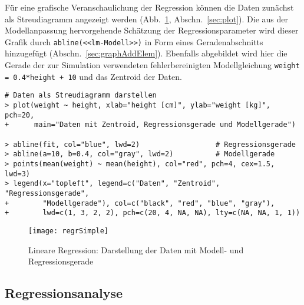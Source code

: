 Für eine grafische Veranschaulichung der Regression können die Daten zunächst als Streudiagramm angezeigt werden (Abb.\ \ref{fig:regrSimple}, Abschn.\ \ref{sec:plot}). Die aus der Modellanpassung hervorgehende Schätzung der Regressionsparameter wird dieser Grafik durch \lstinline!abline(<<lm-Modell>>)! in Form eines Geradenabschnitts hinzugefügt (Abschn.\ \ref{sec:graphAddElem}). Ebenfalls abgebildet wird hier die Gerade der zur Simulation verwendeten fehlerbereinigten Modellgleichung \lstinline!weight = 0.4*height + 10! und das Zentroid der Daten.
\begin{lstlisting}
# Daten als Streudiagramm darstellen
> plot(weight ~ height, xlab="height [cm]", ylab="weight [kg]", pch=20,
+      main="Daten mit Zentroid, Regressionsgerade und Modellgerade")

> abline(fit, col="blue", lwd=2)                  # Regressionsgerade
> abline(a=10, b=0.4, col="gray", lwd=2)          # Modellgerade
> points(mean(weight) ~ mean(height), col="red", pch=4, cex=1.5, lwd=3)
> legend(x="topleft", legend=c("Daten", "Zentroid", "Regressionsgerade",
+        "Modellgerade"), col=c("black", "red", "blue", "gray"),
+        lwd=c(1, 3, 2, 2), pch=c(20, 4, NA, NA), lty=c(NA, NA, 1, 1))
\end{lstlisting}

\begin{figure}[ht]
\centering
\texttt{[image: regrSimple]}
\vspace*{-1em}
\caption{Lineare Regression: Darstellung der Daten mit Modell- und Regressionsgerade}
\label{fig:regrSimple}
\end{figure}

\subsection{Regressionsanalyse}
\label{sec:regrAnalysis}

